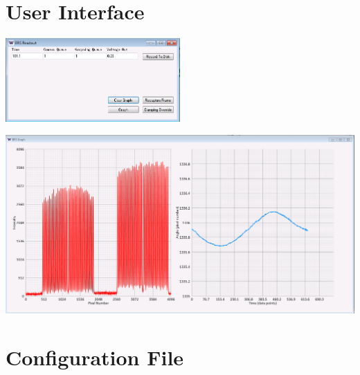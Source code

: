 \documentclass{article}
\begin{document}
\section{User Interface}

\begin{center}
\includegraphics[width=0.5\textwidth]{BRSReadoutScreen.png}\\
\end{center}
\includegraphics[width=\textwidth]{BRSReadoutScreenGraph.png}
\section{Configuration File}
\end{document}
